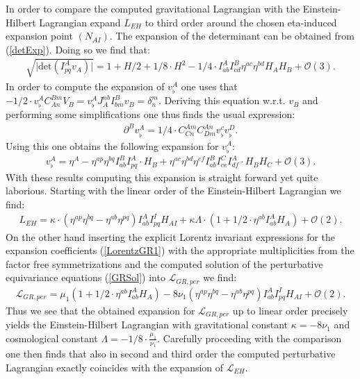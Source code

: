 \documentclass[a4paper,12pt, DIV=14, BCOR=5mm, twoside, headsepline]{scrbook}
\begin{document}
In order to compare the computed gravitational Lagrangian with the Einstein-Hilbert Lagrangian expand $L_{EH}$ to third order around the chosen eta-induced expansion point $(N_{AI})$. The expansion of the determinant can be obtained from (\ref{detExp}). Doing so we find that:
\begin{align}
   \sqrt{\vert \mathrm{det} \left ( I^A_{pq}v_A \right ) \vert } = 1 + H/2 +1/8 \cdot H^2 - 1/4 \cdot I^A_{ab}I^B_{cd} \eta^{ac} \eta^{bd} H_A H_B + \mathcal{O}(3).   
\end{align}
In order to compute the expansion of $v^A_{\flat}$ one uses that $-1/2 \cdot v_{\flat}^AC_{An}^{Bm}V_B = v_{\flat}^A J_A^{nb}I^B_{bm}v_B = \delta^m_n$. Deriving this equation w.r.t. $v_B$ and performing some simplifications one thus finds the usual expression:
\begin{align}
    \partial^Bv_{\flat}^A = 1/4 \cdot C_{Cn}^{Am}C_{Dm}^{An}v_{\flat}^c v_{\flat}^{D}.
\end{align}
Using this one obtains the following expansion for $v_{\flat}^A$:
\begin{align}
    v_{\flat}^A = \eta^A - \eta^{ap}\eta^{bq} I^B_{ab} I^A_{pq} \cdot H_B + \eta^{ac}\eta^{bd}\eta^{ef} I^B_{ab} I^C_{ce} I^A_{df} \cdot H_BH_C + \mathcal{O}(3).  
\end{align}
With these results computing this expansion is straight forward yet quite laborious.
Starting with the linear order of the Einstein-Hilbert Lagrangian we find:
\begin{align}
        L_{EH} = \kappa \cdot (\eta^{ap}\eta^{bq} - \eta^{ab}\eta^{pq}) I^{A}_{ab}I^{I}_{pq} H_{AI} + \kappa \Lambda \cdot (1 + 1/2 \cdot \eta^{ab} I_{ab}^A H_A) + \mathcal{O}(2).
\end{align}
On the other hand inserting the explicit Lorentz invariant expressions for the expansion coefficients (\ref{LorentzGR1}) with the appropriate multiplicities from the factor free symmetrizations and the computed solution of the perturbative equivariance equations (\ref{GRSol}) into $\mathcal{L}_{GR,per}$ we find:
\begin{align}
    \mathcal{L}_{GR,per} = \mu_1(1 + 1/2 \cdot \eta^{ab} I_{ab}^A H_A) - 8 \nu_1 \left(\eta^{ap}\eta^{bq} - \eta^{ab}\eta^{pq} \right )I^{A}_{ab}I^{I}_{pq} H_{AI} + \mathcal{O}(2).
\end{align}
Thus we see that the obtained expansion for $\mathcal{L}_{GR,per}$ up to linear order precisely yields the Einstein-Hilbert Lagrangian with gravitational constant $\kappa = -8 \nu_1$ and cosmological constant $\Lambda = -1/8 \cdot \frac{\mu_1}{\nu_1}$. Carefully proceeding with the comparison one then finds that also in second and third order the computed perturbative Lagrangian exactly coincides with the expansion of $\mathcal{L}_{EH}$.  
\end{document}
